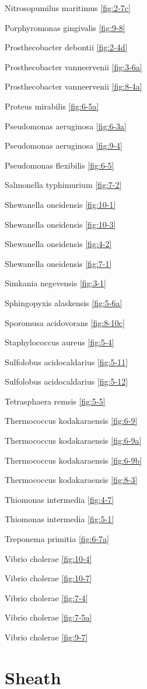 \documentclass[]{tufte-book}
\begin{document}
Nitrosopumilus maritimus \ref{fig:2-7c}

Porphyromonas gingivalis \ref{fig:9-8}

Prosthecobacter debontii \ref{fig:2-4d}

Prosthecobacter vanneervenii \ref{fig:3-6a}

Prosthecobacter vanneervenii \ref{fig:8-4a}

Proteus mirabilis \ref{fig:6-5a}

Pseudomonas aeruginosa \ref{fig:6-3a}

Pseudomonas aeruginosa \ref{fig:9-4}

Pseudomonas flexibilis \ref{fig:6-5}

Salmonella typhimurium \ref{fig:7-2}

Shewanella oneidensis \ref{fig:10-1}

Shewanella oneidensis \ref{fig:10-3}

Shewanella oneidensis \ref{fig:4-2}

Shewanella oneidensis \ref{fig:7-1}

Simkania negevensis \ref{fig:3-1}

Sphingopyxis alaskensis \ref{fig:5-6a}

Sporomusa acidovorans \ref{fig:8-10c}

Staphylococcus aureus \ref{fig:5-4}

Sulfolobus acidocaldarius \ref{fig:5-11}

Sulfolobus acidocaldarius \ref{fig:5-12}

Tetrasphaera remsis \ref{fig:5-5}

Thermococcus kodakaraensis \ref{fig:6-9}

Thermococcus kodakaraensis \ref{fig:6-9a}

Thermococcus kodakaraensis \ref{fig:6-9b}

Thermococcus kodakaraensis \ref{fig:8-3}

Thiomonas intermedia \ref{fig:4-7}

Thiomonas intermedia \ref{fig:5-1}

Treponema primitia \ref{fig:6-7a}

Vibrio cholerae \ref{fig:10-4}

Vibrio cholerae \ref{fig:10-7}

Vibrio cholerae \ref{fig:7-4}

Vibrio cholerae \ref{fig:7-5a}

Vibrio cholerae \ref{fig:9-7}

\hypertarget{sheath-1}{%
\section*{Sheath}\label{sheath-1}}
\end{document}
